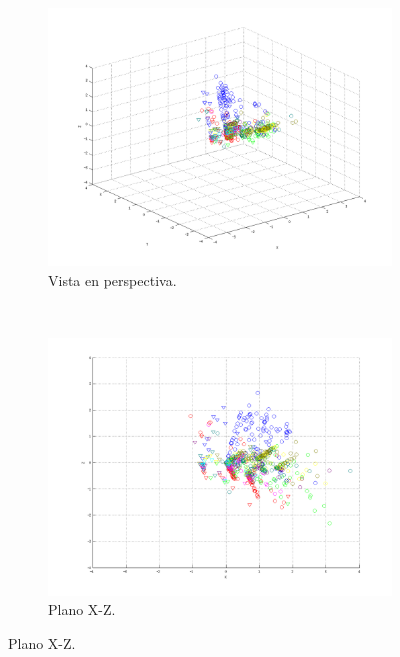 \documentclass[informe.tex]{subfiles}
\begin{document}
	\begin{figure}[H]
        \centering
        \hspace*{-6.5cm}
        \begin{subfigure}[b]{0.49\textwidth}
                \includegraphics[width=\textwidth]{graficos/fold1_criterioParadao_reglas_alpha0_rep4_0P.png}
                \caption{Vista en perspectiva.}
        \end{subfigure}%
        ~
        \begin{subfigure}[b]{0.49\textwidth}
                \includegraphics[width=\textwidth]{graficos/fold1_criterioParadao_reglas_alpha0_rep4_1XZ.png}
                \caption{Plano X-Z.}
        \end{subfigure}
        

\end{figure}
\end{document}
